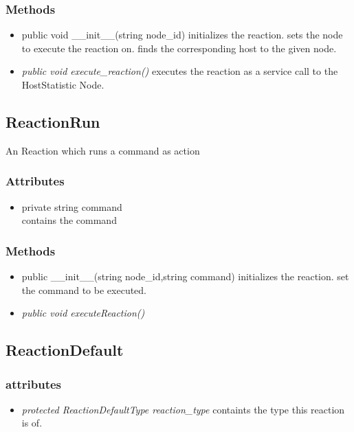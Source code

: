 \subsubsection{Methods}
\begin{itemize}
	\item public void \_\_init\_\_(string node\_id)
		initializes the reaction. sets the node to execute the reaction on. finds the corresponding host to the given node.
	\item \textit{ public void execute\_reaction() }
		executes the reaction as a service call to the HostStatistic Node.
\end{itemize}


\subsection{ReactionRun}
	An Reaction which runs a command as action 
\subsubsection{Attributes}
\begin{itemize}
	\item private string command
	\\ contains the command
\end{itemize}
\subsubsection{Methods}
\begin{itemize}
	\item public \_\_init\_\_(string node\_id,string command)
		initializes the reaction. set the command to be executed.
	\item \textit{ public void executeReaction() }
\end{itemize}


\subsection{ReactionDefault}
\subsubsection{attributes}
\begin{itemize}
	\item \textit{ protected ReactionDefaultType reaction\_type}
		containts the type this reaction is of.
\end{itemize}
